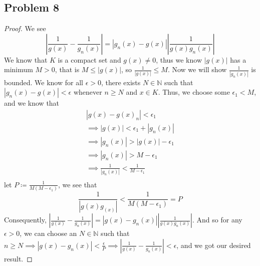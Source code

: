 \documentclass[12pt]{article}
\begin{document}
\subsection*{Problem 8}
\begin{proof}
    We see
    $$\left| \frac{1}{g(x)} - \frac{1}{g_n(x)}\right| = \left| g_n(x) - g(x)\right| \left| \frac{1}{g(x)g_n(x)}\right| $$
    We know that $K$ is a compact set and $g(x) \ne 0$, thus we know $|g(x)|$ has a minimum $M > 0$, that is $M \le |g(x)|$, so $\frac{1}{|g(x)|} \le M$. 
    Now we will show $\frac{1}{|g_n(x)|}$ is bounded. 
    We know for all $\epsilon > 0$, there exists $N \in \mathbb{N}$ such that $|g_n(x) - g(x)| < \epsilon$ whenever $n \ge N$ and $x \in K$. 
    Thus, we choose some $\epsilon_1 < M$, and we know that 
    \begin{align*}
        |g(x) - g(x)_n|< \epsilon_1 \\
        \implies |g(x)| < \epsilon_1 + |g_n(x)| \\
        \implies |g_n(x)| > |g(x)| - \epsilon_1 \\
        \implies |g_n(x)| >  M - \epsilon_1 \\
        \implies \frac{1}{|g_n(x)|} < \frac{1}{M - \epsilon_1}\\
    \end{align*}
    let $P \coloneq \frac{1}{M(M - \epsilon_1)}$, we see that 
    $$\frac{1}{|g(x)g_(x)|} < \frac{1}{M(M - \epsilon_1)} = P$$
    Consequently, $\left| \frac{1}{g(x)} - \frac{1}{g_n(x)}\right| = \left| g(x) - g_n(x)\right| \left| \frac{1}{g(x)g_n(x)}\right| $.
    And so for any $\epsilon > 0$, we can choose an $N \in \mathbb{N}$ such that $ n \ge N \implies |g(x) - g_n(x)| < \frac{\epsilon}{P} \implies \left| \frac{1}{g(x)} - \frac{1}{g_n(x)}\right| < \epsilon$, and we got our desired result.

    
    
\end{proof}
\end{document}
